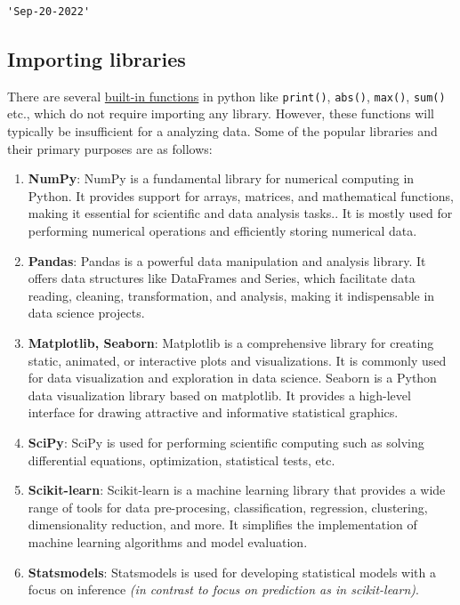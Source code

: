 \documentclass[
  letterpaper,
  DIV=11,
  numbers=noendperiod]{scrreprt}
\begin{document}
\begin{verbatim}
'Sep-20-2022'
\end{verbatim}

\hypertarget{importing-libraries}{%
\subsection{Importing libraries}\label{importing-libraries}}

There are several
\href{https://docs.python.org/3/library/functions.html}{built-in
functions} in python like \texttt{print()}, \texttt{abs()},
\texttt{max()}, \texttt{sum()} etc., which do not require importing any
library. However, these functions will typically be insufficient for a
analyzing data. Some of the popular libraries and their primary purposes
are as follows:

\begin{enumerate}
\def\labelenumi{\arabic{enumi}.}
\item
  \textbf{NumPy}: NumPy is a fundamental library for numerical computing
  in Python. It provides support for arrays, matrices, and mathematical
  functions, making it essential for scientific and data analysis
  tasks.. It is mostly used for performing numerical operations and
  efficiently storing numerical data.
\item
  \textbf{Pandas}: Pandas is a powerful data manipulation and analysis
  library. It offers data structures like DataFrames and Series, which
  facilitate data reading, cleaning, transformation, and analysis,
  making it indispensable in data science projects.
\item
  \textbf{Matplotlib, Seaborn}: Matplotlib is a comprehensive library
  for creating static, animated, or interactive plots and
  visualizations. It is commonly used for data visualization and
  exploration in data science. Seaborn is a Python data visualization
  library based on matplotlib. It provides a high-level interface for
  drawing attractive and informative statistical graphics.
\item
  \textbf{SciPy}: SciPy is used for performing scientific computing such
  as solving differential equations, optimization, statistical tests,
  etc.
\item
  \textbf{Scikit-learn}: Scikit-learn is a machine learning library that
  provides a wide range of tools for data pre-procesing, classification,
  regression, clustering, dimensionality reduction, and more. It
  simplifies the implementation of machine learning algorithms and model
  evaluation.
\item
  \textbf{Statsmodels}: Statsmodels is used for developing statistical
  models with a focus on inference \emph{(in contrast to focus on
  prediction as in scikit-learn)}.
\end{enumerate}
\end{document}
